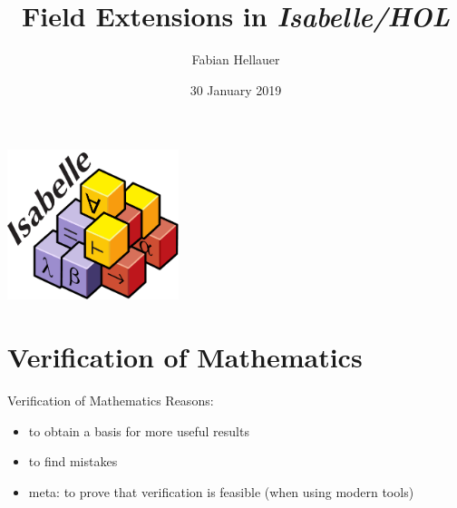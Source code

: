 \documentclass[%
	sans,
	12pt,
]{beamer}
\title{Field Extensions in \emph{Isabelle/HOL} \vspace*{-0.5em}}
\author{\normalsize Fabian Hellauer}
\institute[]{\footnotesize Technische Universität München}
\date{\footnotesize30 January 2019}
\begin{document}
\maketitle

\begin{frame}
\begin{center}
\includegraphics[width=5cm]{isabelle.pdf}
\end{center}
\end{frame}

\tableofcontents

\newcommand{\pivot}[1]{{\color{red}#1}}
\newcommand{\ltpiv}[1]{{\color{blue}#1}}
\newcommand{\gtpiv}[1]{{\color{olive}#1}}

\section{Verification of Mathematics}
\begin{frame}{Verification of Mathematics}%
Reasons:
\begin{itemize}
	\item to obtain a basis for more useful results\pause
	\item to find mistakes\pause
	\item meta: to prove that verification %
	is feasible (when using modern tools)
\end{itemize}
\end{frame}
\end{document}
